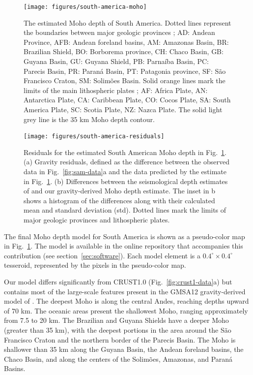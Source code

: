 \documentclass[extra,mreferee]{gji}
\begin{document}
\begin{figure}
    \centering
    \texttt{[image: figures/south-america-moho]}
    \caption{
        The estimated Moho depth of South America.
        Dotted lines represent the boundaries between major geologic provinces
        \citep[after][]{assumpcao2013a, goutorbe2015};
        AD: Andean Province,
        AFB: Andean foreland basins,
        AM: Amazonas Basin,
        BR: Brazilian Shield,
        BO: Borborema province,
        CH: Chaco Basin,
        GB: Guyana Basin,
        GU: Guyana Shield,
        PB: Parnaíba Basin,
        PC: Parecis Basin,
        PR: Paraná Basin,
        PT: Patagonia province,
        SF: São Francisco Craton,
        SM: Solimões Basin.
        Solid orange lines mark the limits of the main lithospheric plates
        \citep{bird2003a};
        AF: Africa Plate,
        AN: Antarctica Plate,
        CA: Caribbean Plate,
        CO: Cocos Plate,
        SA: South America Plate,
        SC: Scotia Plate,
        NZ: Nazca Plate.
        The solid light grey line is the 35 km Moho depth contour.
    }
    \label{fig:sam-moho}
\end{figure}

\begin{figure}
    \centering
    \texttt{[image: figures/south-america-residuals]}
    \caption{
        Residuals for the estimated South American Moho depth in
        Fig.~\ref{fig:sam-moho}.
        (a) Gravity residuals, defined as the difference between the observed data in Fig.~\ref{fig:sam-data}a
        and the data predicted by the estimate in Fig.~\ref{fig:sam-moho}.
        (b) Differences between the seismological depth estimates of
        \citet{assumpcao2013a} and our gravity-derived Moho depth estimate.
        The inset in b shows a histogram of the differences along with their
        calculated mean and standard deviation (std).
        Dotted lines mark the limits of major geologic provinces and
        lithospheric plates.
    }
    \label{fig:sam-residuals}
\end{figure}


The final Moho depth model for South America is shown
as a pseudo-color map in Fig.~\ref{fig:sam-moho}.
The model is available in the online repository that accompanies
this contribution (see section~\ref{sec:software}).
Each model element is a $0.4^\circ \times 0.4^\circ$ tesseroid,
represented by the pixels in the pseudo-color map.

Our model differs significantly from CRUST1.0 (Fig.~\ref{fig:crust1-data}a)
but contains most of the large-scale features
present in the GMSA12 gravity-derived model of \citet{vandermeijde2013}.
The deepest Moho is along the central Andes, reaching depths upward of 70 km.
The oceanic areas present the shallowest Moho, ranging approximately
from 7.5 to 20 km.
The Brazilian and Guyana Shields have a deeper Moho (greater than 35 km),
with the deepest portions in the area around the São Francisco Craton
and the northern border of the Parecis Basin.
The Moho is shallower than 35 km along the Guyana Basin, the Andean foreland
basins, the Chaco Basin, and along the centers of the Solimões, Amazonas, and
Paraná Basins.
\end{document}
